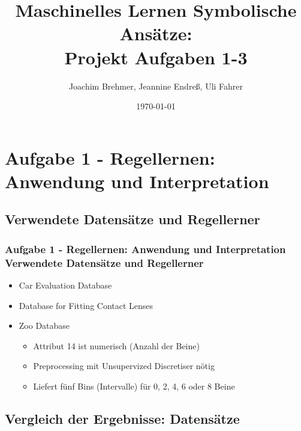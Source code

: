 \documentclass[accentcolor=tud6b,colorbacktitle,inverttitle,landscape,german,presentation,t]{tudbeamer}
\begin{document}
\title[MLDM: Projekt Aufgabe 1-3]{Maschinelles Lernen Symbolische Ansätze:\\ Projekt Aufgaben 1-3}
\subtitle{}

\author[brehmer\_endreß\_fahrer]{Joachim Brehmer, Jeannine Endreß, Uli Fahrer}

\date{\today}

\begin{titleframe}
\tableofcontents
\end{titleframe}

    \section{Aufgabe 1 - Regellernen: Anwendung und Interpretation}
    
    \subsection{Verwendete Datensätze und Regellerner}
    
    \begin{frame}[t]
    \frametitle{Aufgabe 1 - Regellernen: Anwendung und Interpretation\\ Verwendete Datensätze und Regellerner}
        \begin{itemize}
            \item Car Evaluation Database
            \item Database for Fitting Contact Lenses
            \item Zoo Database
            \begin{itemize}
                \item Attribut 14 ist numerisch (Anzahl der Beine)
                \item Preprocessing mit Unsupervized Discretiser nötig
                \item Liefert fünf Bins (Intervalle) für 0, 2, 4, 6 oder 8 Beine
            \end{itemize}
        \end{itemize}
        \vfill
    \end{frame}
    
    \subsection{Vergleich der Ergebnisse: Datensätze}
    
\end{document}
